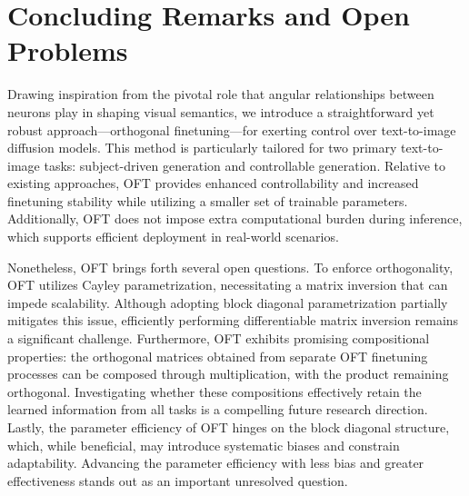 \section{Concluding Remarks and Open Problems}

Drawing inspiration from the pivotal role that angular relationships between neurons play in shaping visual semantics, we introduce a straightforward yet robust approach—orthogonal finetuning—for exerting control over text-to-image diffusion models. This method is particularly tailored for two primary text-to-image tasks: subject-driven generation and controllable generation. Relative to existing approaches, OFT provides enhanced controllability and increased finetuning stability while utilizing a smaller set of trainable parameters. Additionally, OFT does not impose extra computational burden during inference, which supports efficient deployment in real-world scenarios.

Nonetheless, OFT brings forth several open questions. To enforce orthogonality, OFT utilizes Cayley parametrization, necessitating a matrix inversion that can impede scalability. Although adopting block diagonal parametrization partially mitigates this issue, efficiently performing differentiable matrix inversion remains a significant challenge. Furthermore, OFT exhibits promising compositional properties: the orthogonal matrices obtained from separate OFT finetuning processes can be composed through multiplication, with the product remaining orthogonal. Investigating whether these compositions effectively retain the learned information from all tasks is a compelling future research direction. Lastly, the parameter efficiency of OFT hinges on the block diagonal structure, which, while beneficial, may introduce systematic biases and constrain adaptability. Advancing the parameter efficiency with less bias and greater effectiveness stands out as an important unresolved question.